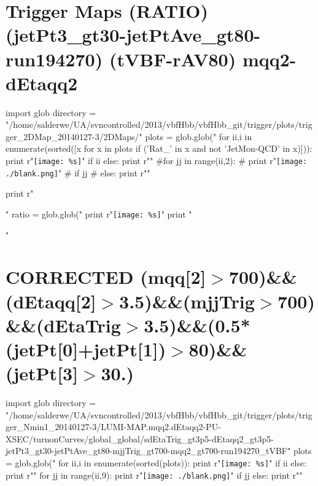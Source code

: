 \documentclass[12pt,english,dvipsnames]{beamer}
\newcommand{\UAoverlay}[0]{%
\begin{tikzpicture}[remember picture,overlay,shift={(current page.north east)}]
\node (zero) at (-1.8cm,-0.93cm) {\texttt{[image: ../logos/CMS.pdf]}\hspace{0.15cm}\texttt{[image: ../logos/CERN.pdf]}\hspace{0.15cm}\texttt{[image: ../logos/UA.pdf]}}; 
\end{tikzpicture}
}
\begin{document}
\section{Trigger Maps (RATIO) (jetPt3\_gt30-jetPtAve\_gt80-run194270) (tVBF-rAV80) mqq2-dEtaqq2}
\begin{frame}[t,fragile]%
\begin{python}
import glob
directory = "/home/salderwe/UA/svncontrolled/2013/vbfHbb/vbfHbb_git/trigger/plots/trigger_2DMap_20140127-3/2DMaps/"
plots = glob.glob("%
for ii,i in enumerate(sorted([x for x in plots if ('Rat_' in x and not 'JetMon-QCD' in x)])):
  print r"\texttt{[image: \%s]}"%
  if ii%
  else: print r"\hfill"
#for jj in range(ii,2):
#  print r"\texttt{[image: ./blank.png]}"
#  if jj%
#  else: print r"\hfill"
  
print r"\begin{minipage}{0.9999\textwidth}\centering"
ratio = glob.glob("%
print r"\texttt{[image: \%s]}"%
print "\end{minipage}"
\end{python} 
\end{frame}

\section{\tiny CORRECTED (mqq[2]$>$700)\&\&(dEtaqq[2]$>$3.5)\&\&(mjjTrig$>$700) \&\&(dEtaTrig$>$3.5)\&\&(0.5*(jetPt[0]+jetPt[1])$>$80)\&\&(jetPt[3]$>$30.)}
\begin{frame}[t,fragile]%
\begin{python}
import glob
directory = "/home/salderwe/UA/svncontrolled/2013/vbfHbb/vbfHbb_git/trigger/plots/trigger_Nmin1_20140127-3/LUMI-MAP.mqq2.dEtaqq2-PU-XSEC/turnonCurves/global_global/sdEtaTrig_gt3p5-dEtaqq2_gt3p5-jetPt3_gt30-jetPtAve_gt80-mjjTrig_gt700-mqq2_gt700-run194270_tVBF"
plots = glob.glob("%
for ii,i in enumerate(sorted(plots)):
  print r"\texttt{[image: \%s]}"%
  if ii%
  else: print r"\hfill"
for jj in range(ii,9):
  print r"\texttt{[image: ./blank.png]}"
  if jj%
  else: print r"\hfill"
\end{python}

\end{frame}
\end{document}
